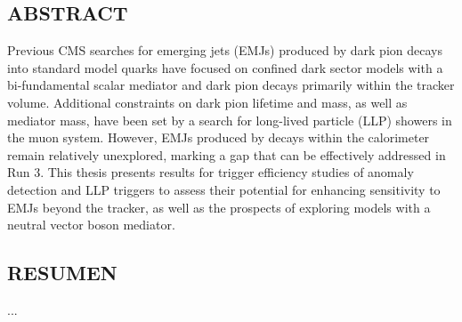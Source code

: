 



\vspace*{0.5in}
\begin{center}
	\section*{ABSTRACT}
\end{center}

\noindent
Previous CMS searches for emerging jets (EMJs) produced by dark pion decays into standard model quarks have focused on confined dark sector models with a bi-fundamental scalar mediator and dark pion decays primarily within the tracker volume. Additional constraints on dark pion lifetime and mass, as well as mediator mass, have been set by a search for long-lived particle (LLP) showers in the muon system. However, EMJs produced by decays within the calorimeter remain relatively unexplored, marking a gap that can be effectively addressed in Run 3. This thesis presents results for trigger efficiency studies of anomaly detection and LLP triggers to assess their potential for enhancing sensitivity to EMJs beyond the tracker, as well as the prospects of exploring models with a neutral vector boson mediator.







\newpage





\vspace*{0.5in}
\begin{center}
	\section*{RESUMEN}
\end{center}

\noindent
...
